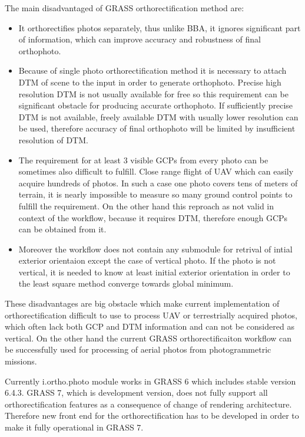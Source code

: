 \documentclass[a4paper,12pt]{article}
\begin{document}
The main disadvantaged of GRASS orthorectification method are:
\begin{itemize}
\item It orthorectifies photos separately, thus unlike BBA, it ignores significant part of information,
 which can improve accuracy and robustness of final orthophoto. 
\item Because of single photo orthorectification method it is necessary to attach DTM of scene to the input 
in order to generate orthophoto. Precise high resolution DTM is not usually available for free so this 
requirement can be significant obstacle for producing accurate orthophoto. If sufficiently precise 
DTM is not available, freely available DTM with usually lower resolution can be used, therefore  
accuracy of final orthophoto will be limited by insufficient resolution of DTM.
\item The requirement for at least 3 visible GCPs from every photo can be sometimes also difficult to fulfill.
Close range flight of UAV which can easily acquire hundreds of photos.
In such a case one photo covers tens of meters
of terrain, it is nearly impossible to measure so many ground control points to fulfill the requirement. 
On the other hand this reproach as not valid in context of the workflow, because it requires DTM, therefore 
enough GCPs can be obtained from it.
\item Moreover the workflow does not contain any submodule for retrival of intial exterior orientaion except
 the case of vertical photo.   If the photo 
is not vertical, it is needed to know at least initial exterior orientation 
in order to the least square method converge towards global minimum.
\end{itemize}

These disadvantages are big obstacle which make current implementation of orthorectification difficult to use  
to process UAV or terrestrially acquired photos, which often lack both GCP and DTM information and can not be considered as vertical.
On the other hand the current GRASS orthorectificaiton workflow can be successfully used for processing
of aerial photos from photogrammetric missions.

Currently i.ortho.photo module works in GRASS 6 which includes stable version 6.4.3.
GRASS 7, which is development version, does not fully support all orthorectification features 
as a consequence of change of rendering architecture.
Therefore new front end for the 
orthorectification has to be developed in order to make it fully operational 
in GRASS 7. 
\end{document}
